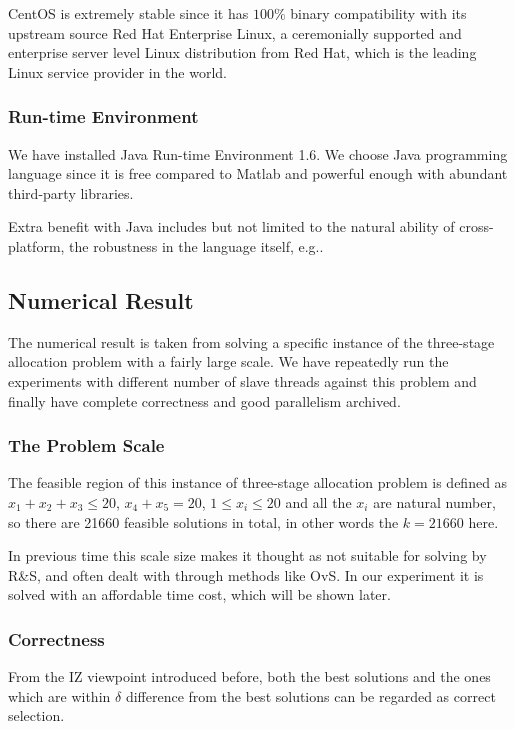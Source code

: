 CentOS is extremely stable since it has $100\%$ binary compatibility with its upstream source Red Hat Enterprise Linux, a ceremonially supported and enterprise server level Linux distribution from Red Hat, which is the leading Linux service provider in the world. 

\subsubsection{Run-time Environment}

We have installed Java Run-time Environment 1.6. We choose Java programming language since it is free compared to Matlab and powerful enough with abundant third-party libraries.

Extra benefit with Java includes but not limited to the natural ability of cross-platform, the robustness in the language itself, e.g..

\subsection{Numerical Result}

The numerical result is taken from solving a specific instance of the three-stage allocation problem with a fairly large scale. We have repeatedly run the experiments with different number of slave threads against this problem and finally have complete correctness and good parallelism archived.

\subsubsection{The Problem Scale}

The feasible region of this instance of three-stage allocation problem is defined as $x_1 + x_2 + x_3 \leqslant 20$, $x_4 + x_5 = 20$, $1 \leqslant x_i \leqslant 20$ and all the $x_i$ are natural number, so there are 21660 feasible solutions in total, in other words the $k = 21660$ here.

In previous time this scale size makes it thought as not suitable for solving by R\&S, and often dealt with through methods like OvS. In our experiment it is solved with an affordable time cost, which will be shown later.

\subsubsection{Correctness}

From the IZ viewpoint introduced before, both the best solutions and the ones which are within $\delta$ difference from the best solutions can be regarded as correct selection.

